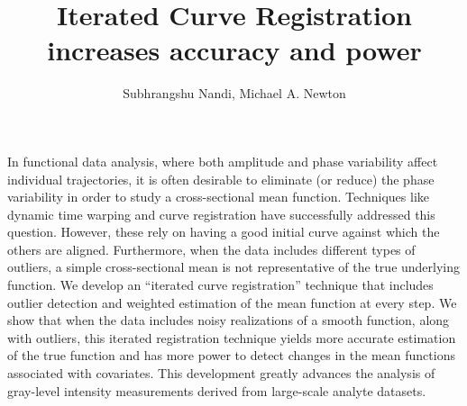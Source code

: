 \documentclass[11pt]{extarticle} %
\begin{document}

\title{Iterated Curve Registration increases accuracy and power}
\author{Subhrangshu Nandi, Michael A. Newton} 

\maketitle

In functional data analysis, where both amplitude and phase variability affect individual trajectories, it is often desirable to eliminate (or reduce) the phase variability in order to study a cross-sectional mean function. Techniques like dynamic time warping and curve registration have successfully addressed this question. However, these rely on having a good initial curve against which the others are aligned. Furthermore, when the data includes different types of outliers, a simple cross-sectional mean is not representative of the true underlying function. We develop an ``iterated curve registration'' technique that includes outlier detection and weighted estimation of the mean function at every step. We show that when the data includes noisy realizations of a smooth function, along with outliers, this iterated registration technique yields more accurate estimation of the true function and has more power to detect changes in the mean functions associated with covariates. This development greatly advances the analysis of gray-level intensity measurements derived from large-scale analyte datasets.
\end{document}
